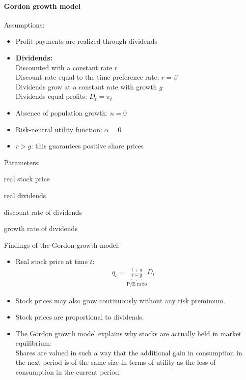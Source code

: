 \documentclass[a4paper,landscape,7pt,fleqn]{scrartcl}
\renewcommand{\emph}[1]{\textbf{#1}}
\begin{document}
\begin{multicols*}{3}
\paragraph{Gordon growth model}

Assumptions:

\begin{itemize}
\item Profit payments are realized through dividends
\item \emph{Dividends:} \\
Discounted with a constant rate $r$ \\
Discount rate equal to the time preference rate: $r = \beta$ \\
Dividends grow at a constant rate with growth $g$ \\
Dividends equal profits: $D_t = \pi_t$
\item Absence of population growth: $n=0$
\item Risk-neutral utility function: $\alpha=0$
\item $r > g$: this guarantees positive share prices
\end{itemize}

{\setlength{\columnseprule}{0pt}
\begin{multicols}{2}
Parameters:
\begin{description}[style=multiline,leftmargin=0.4cm,font=\normalfont]
\item[$q_t$] real stock price
\item[$D_t$] real dividends
\item
\item[$r$] discount rate of dividends
\item[$g$] growth rate of dividends
\end{description}
\end{multicols}}

Findings of the Gordon growth model:
\begin{itemize}
\item Real stock price at time $t$:
\begin{align*}
q_t = \underbrace{\frac{1+g}{r-g}}_\text{P/E ratio} D_t
\end{align*}
\item Stock prices may also grow continuously without any risk premimum.
\item Stock prices are proportional to dividends.
\item The Gordon growth model explains why stocks are actually held in market equilibrium: \\
Shares are valued in such a way that the additional gain in consumption in the next period is of the same size in terms of utility as the loss of consumption in the current period.
\end{itemize}


\end{multicols*}
\end{document}
